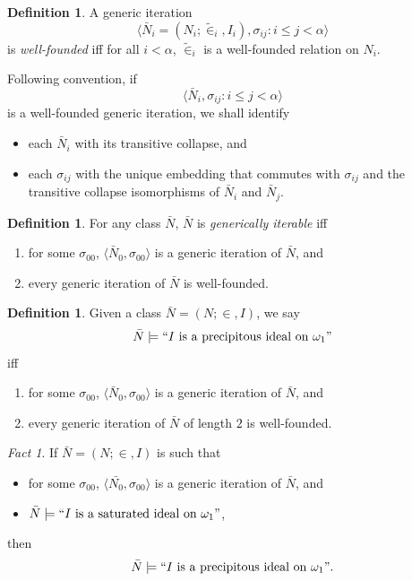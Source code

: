 \documentclass[12pt, twoside]{memoir}
\numberwithin{equation}{section}
\theoremstyle{definition}
\newtheorem{defi}[thm]{Definition}
\theoremstyle{remark}
\newtheorem{fact}[thm]{Fact}
\theoremstyle{definition}
\theoremstyle{definition}
\theoremstyle{definition}
\theoremstyle{remark}
\begin{document}
\begin{defi}
A generic iteration $$\langle \bar{N}_i = (N_i; \tilde{\in}_i, I_i), \sigma_{ij} : i \leq j < \alpha \rangle$$ is \emph{well-founded} iff for all $i < \alpha$, $\tilde{\in}_i$ is a well-founded relation on $N_i$.
\end{defi}

Following convention, if $$\langle \bar{N}_i, \sigma_{ij} : i \leq j < \alpha \rangle$$ is a well-founded generic iteration, we shall identify 
\begin{itemize}
    \item each $\bar{N}_i$ with its transitive collapse, and
    \item each $\sigma_{ij}$ with the unique embedding that commutes with $\sigma_{ij}$ and the transitive collapse isomorphisms of $\bar{N}_i$ and $\bar{N}_j$.
\end{itemize}

\begin{defi}
For any class $\bar{N}$, $\bar{N}$ is \emph{generically iterable} iff  
\begin{enumerate}[label=(\alph*)]
    \item for some $\sigma_{00}$, $\langle \bar{N}_0, \sigma_{00} \rangle$ is a generic iteration of $\bar{N}$, and
    \item every generic iteration of $\bar{N}$ is well-founded.
\end{enumerate}
\end{defi}

\begin{defi}
Given a class $\bar{N} = (N; \in, I)$, we say 
\begin{equation*}
    \bar{N} \models ``I \text{ is a precipitous ideal on } \omega_1"
\end{equation*}
iff
\begin{enumerate}[label=(\alph*)]
    \item for some $\sigma_{00}$, $\langle \bar{N}_0, \sigma_{00} \rangle$ is a generic iteration of $\bar{N}$, and
    \item every generic iteration of $\bar{N}$ of length $2$ is well-founded.
\end{enumerate}
\end{defi}

\begin{fact}\label{satipre}
If $\bar{N} = (N; \in, I)$ is such that 
\begin{itemize}
    \item for some $\sigma_{00}$, $\langle \bar{N_0}, \sigma_{00} \rangle$ is a generic iteration of $\bar{N}$, and
    \item $\bar{N} \models ``I \text{ is a saturated ideal on } \omega_1"$,
\end{itemize}
then
\begin{equation*}
    \bar{N} \models ``I \text{ is a precipitous ideal on } \omega_1".
\end{equation*}
\end{fact}
\end{document}
